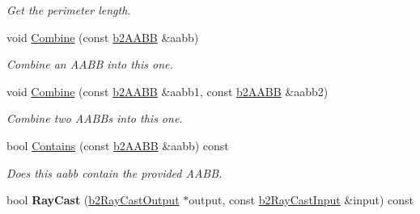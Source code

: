 \begin{DoxyCompactItemize}
\begin{DoxyCompactList}\small\item\em Get the perimeter length. \end{DoxyCompactList}\item 
\hypertarget{structb2_a_a_b_b_ad551edba62d2ad6094672a9ba3e26496}{void \hyperlink{structb2_a_a_b_b_ad551edba62d2ad6094672a9ba3e26496}{Combine} (const \hyperlink{structb2_a_a_b_b}{b2\-A\-A\-B\-B} \&aabb)}\label{structb2_a_a_b_b_ad551edba62d2ad6094672a9ba3e26496}

\begin{DoxyCompactList}\small\item\em Combine an A\-A\-B\-B into this one. \end{DoxyCompactList}\item 
\hypertarget{structb2_a_a_b_b_a34b9c7d824df845c10caa9c12ae90452}{void \hyperlink{structb2_a_a_b_b_a34b9c7d824df845c10caa9c12ae90452}{Combine} (const \hyperlink{structb2_a_a_b_b}{b2\-A\-A\-B\-B} \&aabb1, const \hyperlink{structb2_a_a_b_b}{b2\-A\-A\-B\-B} \&aabb2)}\label{structb2_a_a_b_b_a34b9c7d824df845c10caa9c12ae90452}

\begin{DoxyCompactList}\small\item\em Combine two A\-A\-B\-Bs into this one. \end{DoxyCompactList}\item 
\hypertarget{structb2_a_a_b_b_aba5fc112e3c8d05e034a21d95fc37704}{bool \hyperlink{structb2_a_a_b_b_aba5fc112e3c8d05e034a21d95fc37704}{Contains} (const \hyperlink{structb2_a_a_b_b}{b2\-A\-A\-B\-B} \&aabb) const }\label{structb2_a_a_b_b_aba5fc112e3c8d05e034a21d95fc37704}

\begin{DoxyCompactList}\small\item\em Does this aabb contain the provided A\-A\-B\-B. \end{DoxyCompactList}\item 
\hypertarget{structb2_a_a_b_b_a8a9a3dbc76c1175e80bb767437240ef5}{bool {\bfseries Ray\-Cast} (\hyperlink{structb2_ray_cast_output}{b2\-Ray\-Cast\-Output} $\ast$output, const \hyperlink{structb2_ray_cast_input}{b2\-Ray\-Cast\-Input} \&input) const }\label{structb2_a_a_b_b_a8a9a3dbc76c1175e80bb767437240ef5}

\end{DoxyCompactItemize}
